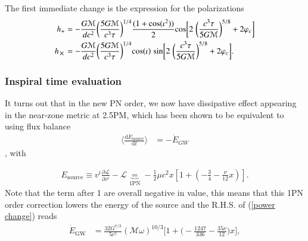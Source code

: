 \documentclass[a4paper, 12pt]{article}
\begin{document}
  The first immediate change is the expression for the
  polarizations 
  \begin{align}
    \label{polarizations change at 1PN}
    h_{+} &= - \frac{G \mathcal{M}}{d c^2} \bigg(\frac{5G
    \mathcal{M}}{c^3 \tau} \bigg)^{1/4} \frac{(1 +
    \mathrm{cos}(\iota^2) )}{2} \mathrm{cos} \bigg[2 \hspace{0.1cm}
    \bigg(\frac{c^3 \tau}{5G \mathcal{M}} \bigg)^{5/8} + 2 \varphi_c
    \bigg]  \\ 
    h_{\cross} &= - \frac{G \mathcal{M}}{d c^2} \bigg(\frac{5G
    \mathcal{M}}{c^3 \tau} \bigg)^{1/4} \mathrm{cos}(\iota) \hspace{0.1cm} \mathrm{sin}
    \bigg[ 2 \hspace{0.1cm}
    \bigg(\frac{c^3 \tau}{5G \mathcal{M}} \bigg)^{5/8} + 2 \varphi_c
    \bigg].
  \end{align}

  \subsubsection{Inspiral time evaluation}%
    \label{sub:Inspiral time evaluation}
    It turns out that in the new PN order, we now have dissipative
    effect appearing in the near-zone metric at 2.5PM, which has been
    shown to be equivalent to using flux balance 
    \begin{align}
      \label{power change}
      \langle \frac{\mathrm{d}E_{\mathrm{source}}}{\mathrm{d}t} \rangle
      &= - \dot{E}_{GW} 
    \end{align}, with 

      \begin{align}
        \label{expression of E in inspiral time}
         E_{\mathrm{source}} \equiv v^{i} \frac{\partial
    \mathcal{L}}{\partial v^{i} } - \mathcal{L}
    \underbrace{=}_{\textrm{1PN}} - \frac{1}{2}\mu c^2 x[ 1  +
    (-\frac{3}{4} - \frac{\nu}{12} x) ].
      \end{align}
      Note that the term after 1 are overall negative in value, this
      means that this 1PN order correction lowers the energy of the
      source and the \textnormal{R.H.S.} of (\ref{power change})
      reads 
      \begin{align}
        \label{GW luminosity}
        \dot{E}_{\mathrm{GW}} &= \frac{32 G^{7/3} }{5 c^5}
        (\mathcal{M}\omega)^{10/3} \bigg[1 +
        \bigg(-\frac{1247}{336} - \frac{35 \nu}{12} \bigg)x
        \bigg],   
      \end{align}
\end{document}

